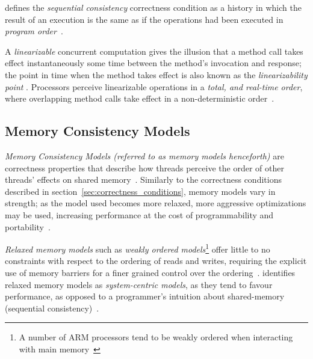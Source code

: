 \citeauthor{lamport1979make} defines the \emph{sequential consistency}
correctness condition as a history in which the result of an execution is the
same as if the operations had been executed in \emph{program
order}~\citep{lamport1979make}.

A \emph{linearizable} concurrent computation gives the illusion that a method
call takes effect instantaneously some time between the method's invocation and
response; the point in time when the method takes effect is also known as the
\emph{linearizability point} \citep{herlihy2020art,herlihy1990linearizability}.
Processors perceive linearizable operations in a \emph{total, and real-time
order}, where overlapping method calls take effect in a non-deterministic
order~\citep[Section~3.6.2]{herlihy2020art}.



\subsection{Memory Consistency Models}
\emph{Memory Consistency Models (referred to as memory models henceforth)} are correctness properties that describe how
threads perceive the order of other threads' effects on shared
memory~\citep[Section~3.7]{herlihy2020art}. Similarly to the correctness
conditions described in section~\ref{sec:correctness_conditions}, memory
models vary in strength; as the model used becomes more relaxed, more aggressive
optimizations may be used, increasing performance at the cost of
programmability and portability~\citep{gharachorloo1996consistency}.

\emph{Relaxed memory models} such as \emph{weakly ordered models}\footnote{A number of ARM processors tend to be weakly ordered when interacting with main memory~\citep[Section~A3.5.5]{arm2022architecture}} offer little to no
constraints with respect to the ordering of reads and writes, requiring the
explicit use of memory barriers for a finer grained control over the ordering~\citep{gharachorloo1996consistency}. \citeauthor{gharachorloo1996consistency} identifies relaxed
memory models as \emph{system-centric models}, as they tend to favour
performance, as opposed to a programmer's intuition about shared-memory
(sequential consistency)~\citep{gharachorloo1996consistency}.

